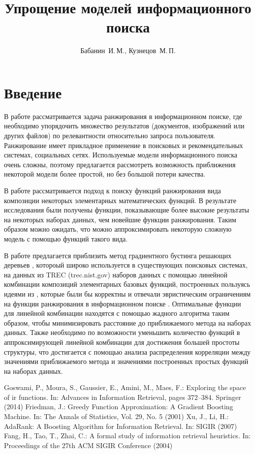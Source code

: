 \documentclass[12pt,twoside]{article}
\title {
Упрощение моделей информационного поиска
}
\author {
Бабанин~И.\,М., Кузнецов~М.\,П.
}
\begin{document}
\maketitle

\section{Введение}
В работе рассматривается задача ранжирования в информационном поиске, где необходимо упорядочить множество результатов (документов, изображений или других файлов) по релевантности относительно запроса пользователя. Ранжирование имеет прикладное применение в поисковых и рекомендательных системах, социальных сетях. Используемые модели информационного поиска очень сложны, поэтому предлагается рассмотреть возможность приближения некоторой модели более простой, но без большой потери качества.

    В работе \cite{Goswami2014} рассматривается подход к поиску функций ранжирования вида композиции некоторых элементарных математических функций. В результате исследования были получены функции, показывающие более высокие результаты на некоторых наборах данных, чем новейшие функции ранжирования. Таким образом можно ожидать, что можно аппроксимировать некоторую сложную модель с помощью функций такого вида.

    В работе предлагается приблизить метод градиентного бустинга решающих деревьев \cite{Friedman2001} \cite{Xu2007}, котороый широко используется в существующих поисковых системах, на данных из TREC (trec.nist.gov) наборов данных с помощью линейной комбинации композиций элементарных базовых функций, построенных пользуясь идеями из \cite{Goswami2014}, которые были бы корректны и отвечали эвристическим ограничениям на функции ранжирования в информационном поиске \cite{Fang2004}. Оптимальные функции для линейной комбинации находятся с помощью жадного алгоритма таким образом, чтобы минимизировать расстояние до приближаемого метода на наборах данных. Также необходимо по возможности уменьшить количество функций в аппроксимирующей линейной комбинации для достижения большей простоты структуры, что достигается с помощью анализа распределения корреляции между значениями приближаемого метода и значениями построенных простых функций на наборах данных.

\newpage

\begin{thebibliography}{99}
Goswami, P., Moura, S., Gaussier, E., Amini, M., Maes, F.: Exploring the space of ir functions. In: Advances in Information Retrieval, pages 372–384. Springer (2014)
Friedman, J.: Greedy Function Approximation: A Gradient Boosting Machine. In: The Annals of Statistics, Vol. 29, No. 5 (2001)
Xu, J., Li, H.: AdaRank: A Boosting Algorithm for Information Retrieval. In: SIGIR (2007)
Fang, H., Tao, T., Zhai, C.: A formal study of information retrieval heuristics. In:
Proceedings of the 27th ACM SIGIR Conference (2004)
\end{thebibliography}
\end{document}
